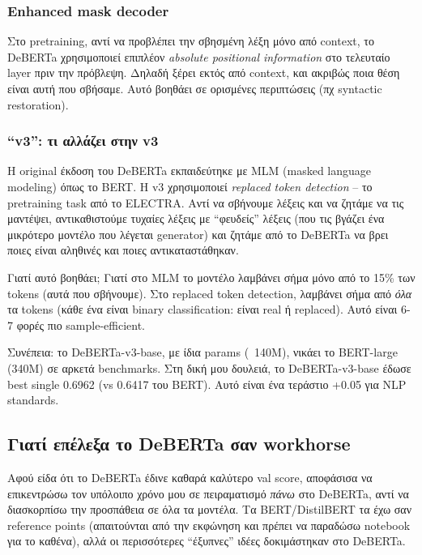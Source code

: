 \documentclass[12pt]{fphw}
\begin{document}
\subsubsection{Enhanced mask decoder}

Στο pretraining, αντί να προβλέπει την σβησμένη λέξη μόνο από context, το DeBERTa χρησιμοποιεί επιπλέον \emph{absolute positional information} στο τελευταίο layer πριν την πρόβλεψη. Δηλαδή ξέρει εκτός από context, και ακριβώς ποια θέση είναι αυτή που σβήσαμε. Αυτό βοηθάει σε ορισμένες περιπτώσεις (πχ syntactic restoration).

\subsubsection{``v3'': τι αλλάζει στην v3}

Η original έκδοση του DeBERTa εκπαιδεύτηκε με MLM (masked language modeling) όπως το BERT. Η v3 χρησιμοποιεί \emph{replaced token detection} -- το pretraining task από το ELECTRA. Αντί να σβήνουμε λέξεις και να ζητάμε να τις μαντέψει, αντικαθιστούμε τυχαίες λέξεις με ``φευδείς'' λέξεις (που τις βγάζει ένα μικρότερο μοντέλο που λέγεται generator) και ζητάμε από το DeBERTa να βρει ποιες είναι αληθινές και ποιες αντικαταστάθηκαν.

Γιατί αυτό βοηθάει; Γιατί στο MLM το μοντέλο λαμβάνει σήμα μόνο από το 15\% των tokens (αυτά που σβήνουμε). Στο replaced token detection, λαμβάνει σήμα από \emph{όλα} τα tokens (κάθε ένα είναι binary classification: είναι real ή replaced). Αυτό είναι 6-7 φορές πιο sample-efficient.

Συνέπεια: το DeBERTa-v3-base, με ίδια params (~140M), νικάει το BERT-large (340M) σε αρκετά benchmarks. Στη δική μου δουλειά, το DeBERTa-v3-base έδωσε best single 0.6962 (vs 0.6417 του BERT). Αυτό είναι ένα τεράστιο +0.05 για NLP standards.

\subsection{Γιατί επέλεξα το DeBERTa σαν workhorse}

Αφού είδα ότι το DeBERTa έδινε καθαρά καλύτερο val score, αποφάσισα να επικεντρώσω τον υπόλοιπο χρόνο μου σε πειραματισμό \emph{πάνω} στο DeBERTa, αντί να διασκορπίσω την προσπάθεια σε όλα τα μοντέλα. Τα BERT/DistilBERT τα έχω σαν reference points (απαιτούνται από την εκφώνηση και πρέπει να παραδώσω notebook για το καθένα), αλλά οι περισσότερες ``έξυπνες'' ιδέες δοκιμάστηκαν στο DeBERTa.
\end{document}
